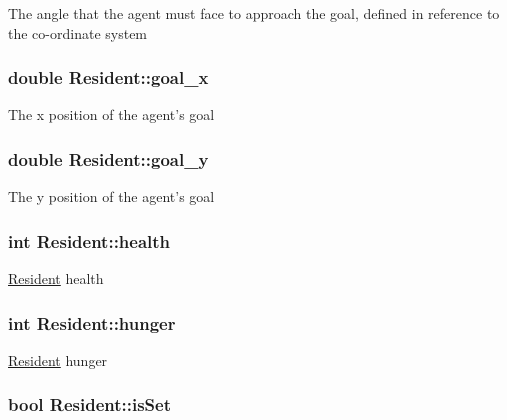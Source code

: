 The angle that the agent must face to approach the goal, defined in reference to the co-\/ordinate system \hypertarget{classResident_adee57a6649dfa4a41d027fbb8d961226}{
\subsubsection[{goal\-\_\-x}]{\setlength{\rightskip}{0pt plus 5cm}double Resident\-::goal\-\_\-x\hspace{0.3cm}{\ttfamily [protected]}}}\label{classResident_adee57a6649dfa4a41d027fbb8d961226}
The x position of the agent's goal \hypertarget{classResident_a30e28a999b67c4db3500c9c3c9989a10}{
\subsubsection[{goal\-\_\-y}]{\setlength{\rightskip}{0pt plus 5cm}double Resident\-::goal\-\_\-y\hspace{0.3cm}{\ttfamily [protected]}}}\label{classResident_a30e28a999b67c4db3500c9c3c9989a10}
The y position of the agent's goal \hypertarget{classResident_ac603d9684120e1ab66a4340797bb7e90}{
\subsubsection[{health}]{\setlength{\rightskip}{0pt plus 5cm}int Resident\-::health\hspace{0.3cm}{\ttfamily [protected]}}}\label{classResident_ac603d9684120e1ab66a4340797bb7e90}
\hyperlink{classResident}{Resident} health \hypertarget{classResident_a337df4272a4640a4039dfbe5c5c4a6d6}{
\subsubsection[{hunger}]{\setlength{\rightskip}{0pt plus 5cm}int Resident\-::hunger\hspace{0.3cm}{\ttfamily [protected]}}}\label{classResident_a337df4272a4640a4039dfbe5c5c4a6d6}
\hyperlink{classResident}{Resident} hunger \hypertarget{classResident_ac5e7527b191e07372c3ea5e9aa81a65d}{
\subsubsection[{is\-Set}]{\setlength{\rightskip}{0pt plus 5cm}bool Resident\-::is\-Set\hspace{0.3cm}{\ttfamily [protected]}}}\label{classResident_ac5e7527b191e07372c3ea5e9aa81a65d}
